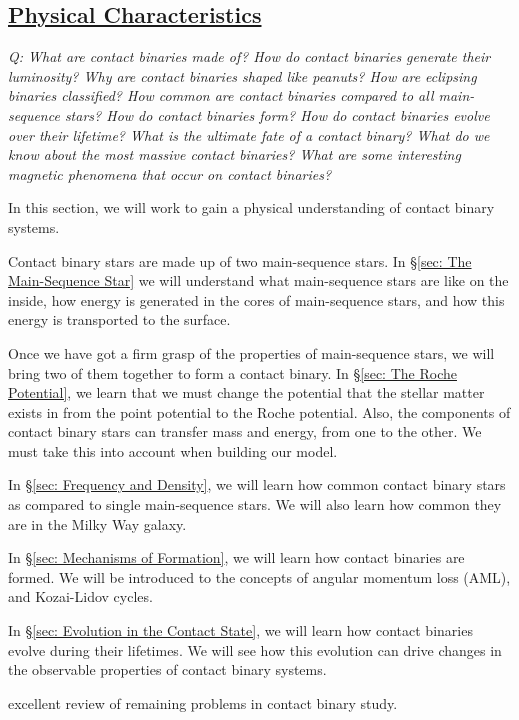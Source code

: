 \documentclass[12pt]{article} %
\numberwithin{equation}{section} %
\begin{document}
\subsection[Physical Characteristics]{\hyperlink{toc}{Physical Characteristics}}

\emph{Q: What are contact binaries made of? How do contact binaries generate their luminosity? Why are contact binaries shaped like peanuts? How are eclipsing binaries classified? How common are contact binaries compared to all main-sequence stars? How do contact binaries form? How do contact binaries evolve over their lifetime? What is the ultimate fate of a contact binary? What do we know about the most massive contact binaries? What are some interesting magnetic phenomena that occur on contact binaries?  }

In this section, we will work to gain a physical understanding of contact binary systems.

Contact binary stars are made up of two main-sequence stars. In \S \ref{sec: The Main-Sequence Star} we will understand what main-sequence stars are like on the inside, how energy is generated in the cores of main-sequence stars, and how this energy is transported to the surface.

Once we have got a firm grasp of the properties of main-sequence stars, we will bring two of them together to form a contact binary. In \S \ref{sec: The Roche Potential}, we learn that we must change the potential that the stellar matter exists in from the point potential to the Roche potential. Also, the components of contact binary stars can transfer mass and energy, from one to the other. We must take this into account when building our model.

In \S \ref{sec: Frequency and Density}, we will learn how common contact binary stars as compared to single main-sequence stars. We will also learn how common they are in the Milky Way galaxy.

In \S \ref{sec: Mechanisms of Formation}, we will learn how contact binaries are formed. We will be introduced to the concepts of angular momentum loss (AML), and Kozai-Lidov cycles.

In \S \ref{sec: Evolution in the Contact State}, we will learn how contact binaries evolve during their lifetimes. We will see how this evolution can drive changes in the observable properties of contact binary systems.


\citep[p.76, ][]{webbink2003contact} excellent review of remaining problems in contact binary study. 
\end{document}
